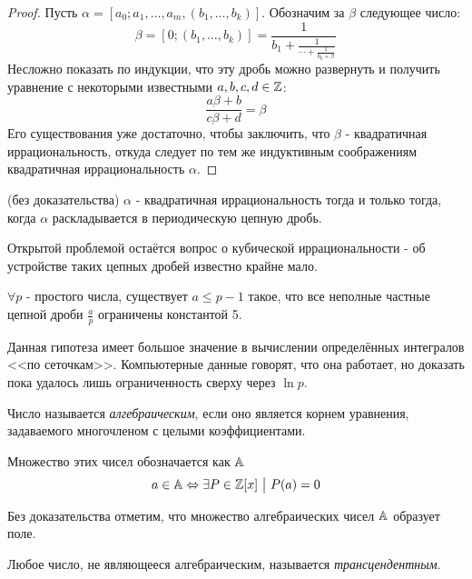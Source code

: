 \begin{proof}
	Пусть $\alpha = [a_0; a_1, \ldots, a_m, (b_1, \ldots, b_k)]$. Обозначим за $\beta$ следующее число:
	\[
		\beta = [0; (b_1, \ldots, b_k)] = \frac{1}{b_1 + \frac{1}{\cdots + \frac{1}{b_k + \beta}}}
	\]
	Несложно показать по индукции, что эту дробь можно развернуть и получить уравнение с некоторыми известными $a, b, c, d \in \mathbb{Z}$:
	\[
		\frac{a\beta + b}{c\beta + d} = \beta
	\]
	Его существования уже достаточно, чтобы заключить, что $\beta$ - квадратичная иррациональность, откуда следует по тем же индуктивным соображениям квадратичная иррациональность $\alpha$.
\end{proof}

\begin{theorem} (без доказательства)
	$\alpha$ - квадратичная иррациональность тогда и только тогда, когда $\alpha$ раскладывается в периодическую цепную дробь.
\end{theorem}

Открытой проблемой остаётся вопрос о кубической иррациональности - об устройстве таких цепных дробей известно крайне мало.

\begin{hypothesis}
	$\forall p$ - простого числа,  существует $a \le p - 1$ такое, что все неполные частные цепной дроби $\frac{a}{p}$ ограничены константой 5.
\end{hypothesis}

\begin{note}
	Данная гипотеза имеет большое значение в вычислении определённых интегралов <<по сеточкам>>. Компьютерные данные говорят, что она работает, но доказать пока удалось лишь ограниченность сверху через $\ln p$.
\end{note}

\begin{definition}
	Число называется \textit{алгебраическим}, если оно является корнем уравнения, задаваемого многочленом с целыми коэффициентами.
	
	Множество этих чисел обозначается как $\mathbb{A}$
	\[
		a \in \mathbb{A} \Leftrightarrow \exists P \in \mathbb{Z}[x] \ \big|\  P(a) = 0
	\]
\end{definition}

\begin{note}
	Без доказательства отметим, что множество алгебраических чисел $\mathbb{A}$ образует поле.
\end{note}

\begin{definition}
	Любое число, не являющееся алгебраическим, называется \textit{трансцендентным}.
\end{definition}

